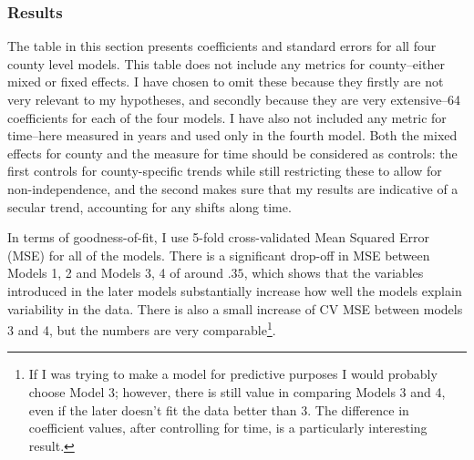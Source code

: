 \documentclass[]{article}
\let\rmarkdownfootnote\footnote%
\def\footnote{\protect\rmarkdownfootnote}
\begin{document}
\subsubsection{Results}\label{results}

The table in this section presents coefficients and standard errors for
all four county level models. This table does not include any metrics
for county--either mixed or fixed effects. I have chosen to omit these
because they firstly are not very relevant to my hypotheses, and
secondly because they are very extensive--64 coefficients for each of
the four models. I have also not included any metric for time--here
measured in years and used only in the fourth model. Both the mixed
effects for county and the measure for time should be considered as
controls: the first controls for county-specific trends while still
restricting these to allow for non-independence, and the second makes
sure that my results are indicative of a secular trend, accounting for
any shifts along time.

In terms of goodness-of-fit, I use 5-fold cross-validated Mean Squared
Error (MSE) for all of the models. There is a significant drop-off in
MSE between Models 1, 2 and Models 3, 4 of around \(.35\), which shows
that the variables introduced in the later models substantially increase
how well the models explain variability in the data. There is also a
small increase of CV MSE between models 3 and 4, but the numbers are
very comparable\footnote{If I was trying to make a model for predictive
  purposes I would probably choose Model 3; however, there is still
  value in comparing Models 3 and 4, even if the later doesn't fit the
  data better than 3. The difference in coefficient values, after
  controlling for time, is a particularly interesting result.}.
\end{document}
